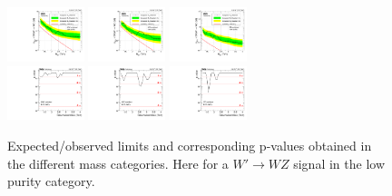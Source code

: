 \begin{figure}[h!]
\centering
\includegraphics[width=0.20\textwidth]{figures/analysis/search1/AN-15-211/limits/brazilianFlag_WZ_WWLP_13TeV_wPDF.pdf}
\includegraphics[width=0.20\textwidth]{figures/analysis/search1/AN-15-211/limits/brazilianFlag_WZ_WZLP_13TeV_wPDF.pdf}
\includegraphics[width=0.20\textwidth]{figures/analysis/search1/AN-15-211/limits/brazilianFlag_WZ_ZZLP_13TeV_wPDF.pdf}\\
\includegraphics[width=0.20\textwidth]{figures/analysis/search1/AN-15-211/pvalues/pvalue_WZinWW_low_purity.pdf}
\includegraphics[width=0.20\textwidth]{figures/analysis/search1/AN-15-211/pvalues/pvalue_WZinWZ_low_purity.pdf}
\includegraphics[width=0.20\textwidth]{figures/analysis/search1/AN-15-211/pvalues/pvalue_WZinZZ_low_purity.pdf}
\caption{Expected/observed limits and corresponding p-values obtained in the different mass categories. Here for a $W'\rightarrow WZ$ signal in the low purity category.}
\label{fig:app:Limits_LPWZ}
\end{figure}

